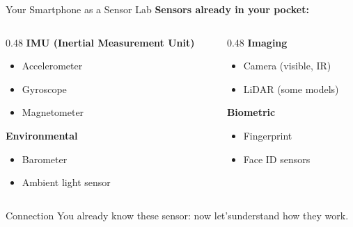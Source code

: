 \documentclass[aspectratio=169,11pt]{beamer}
\begin{document}
\begin{frame}{Your Smartphone as a Sensor Lab}
    \textbf{Sensors already in your pocket:}
    
    \vspace{0.3cm}
    \begin{columns}[T]
        \begin{column}{0.48\textwidth}
            \textbf{IMU (Inertial Measurement Unit)}
            \begin{itemize}
                \item Accelerometer
                \item Gyroscope
                \item Magnetometer
            \end{itemize}
            
            \vspace{0.3cm}
            \textbf{Environmental}
            \begin{itemize}
                \item Barometer
                \item Ambient light sensor
            \end{itemize}
        \end{column}
        \begin{column}{0.48\textwidth}
            \textbf{Imaging}
            \begin{itemize}
                \item Camera (visible, IR)
                \item LiDAR (some models)
            \end{itemize}
            
            \vspace{0.3cm}
            \textbf{Biometric}
            \begin{itemize}
                \item Fingerprint
                \item Face ID sensors
            \end{itemize}
        \end{column}
    \end{columns}
    
    \vspace{0.3cm}
    \begin{block}{Connection}
        You already know these sensor: now let'sunderstand how they work.
    \end{block}
\end{frame}
\end{document}
